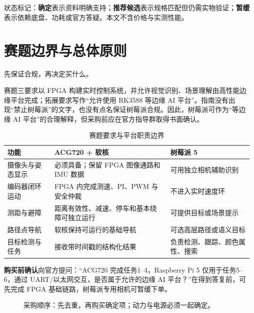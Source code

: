 \documentclass[UTF8,a4paper,zihao=-4,fontset=fandol]{ctexart}
\newcommand{\warn}[2]{\par\smallskip\noindent\colorbox{Warm}{\parbox{\dimexpr\linewidth-2\fboxsep\relax}{\small\textbf{\color{Amber}#1}\quad #2}}\par\smallskip}
\newcommand{\newpagex}{\clearpage}
\newcommand{\tagline}[1]{{\small\color{Muted}#1}\par}
\begin{document}
\vfill
{\small\color{Muted}状态标记：\textbf{确定}表示资料明确支持；\textbf{推荐候选}表示规格匹配但仍需实物验证；\textbf{暂缓}表示依赖底盘、功耗或官方答疑。本文不含价格与实测性能。}

\newpagex
\section{赛题边界与总体原则}\label{sec:rules}
\tagline{先保证合规，再决定买什么。}

赛题三要求以 FPGA 构建实时控制系统，并允许视觉识别、场景理解由高性能边缘平台完成；拓展要求写作“允许使用 RK3588 等边缘 AI 平台”。指南没有出现“禁止树莓派”的文字，也没有点名保证树莓派合规。因此，树莓派可作为“等边缘 AI 平台”的合理解释，但采购前应在官方指导群取得书面确认。\cite{contest}

\begin{table}[H]\small
\caption{赛题要求与平台职责边界}\label{tab:boundary}
\begin{tabularx}{\linewidth}{@{}L{3.1cm}Y Y@{}}\toprule
\textbf{功能} & \textbf{ACG720 + 软核} & \textbf{树莓派 5}\\\midrule
摄像头与姿态显示 & 必须具备；保留 FPGA 图像通路和 IMU 数据 & 可用独立相机辅助识别\\
编码器闭环运动 & FPGA 内完成测速、PI、PWM 与安全仲裁 & 不进入实时速度环\\
测距与避障 & 距离有效性、减速、停车和基本绕障可独立运行 & 可提供目标或场景提示\\
路径点导航 & 软核保持可运行的基础导航 & 可选高层路径或语义目标\\
目标检测与任务 & 接收带时间戳的结构化结果 & 负责检测、跟踪、颜色属性、搜索\\\bottomrule
\end{tabularx}
\end{table}

\warn{购买前确认}{向官方提问：“ACG720 完成任务1--4，Raspberry Pi 5 仅用于任务5--6，通过 UART/以太网交互，是否属于允许的边缘 AI 平台？”在得到答复前，可先完成 FPGA 基础链路，树莓派专用相机可暂缓下单。}

\begin{figure}[H]\centering
{}
\caption{采购顺序：先去重，再购买确定项；动力与电源必须一起确定。}
\end{figure}
\end{document}
